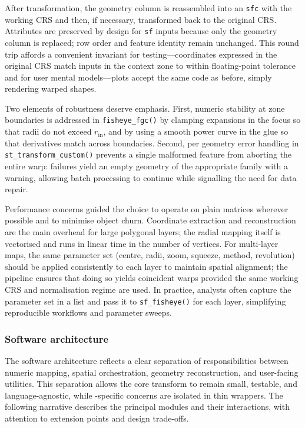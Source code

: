 After transformation, the geometry column is reassembled into an \texttt{sfc} with the working CRS and
then, if necessary, transformed back to the original CRS. Attributes are preserved by design for
\texttt{sf} inputs because only the geometry column is replaced; row order and feature identity remain
unchanged. This round trip affords a convenient invariant for testing---coordinates expressed in the
original CRS match inputs in the context zone to within floating-point tolerance and for user mental
models---plots accept the same code as before, simply rendering warped shapes.

Two elements of robustness deserve emphasis. First, numeric stability at zone boundaries is addressed
in \texttt{fisheye\_fgc()} by clamping expansions in the focus so that radii do not exceed \(r_{\text{in}}\),
and by using a smooth power curve in the glue so that derivatives match across boundaries. Second,
per geometry error handling in \texttt{st\_transform\_custom()} prevents a single malformed feature from
aborting the entire warp: failures yield an empty geometry of the appropriate family with a warning,
allowing batch processing to continue while signalling the need for data repair.

Performance concerns guided the choice to operate on plain matrices wherever possible and to minimise
object churn. Coordinate extraction and reconstruction are the main overhead for large polygonal
layers; the radial mapping itself is vectorised and runs in linear time in the number of vertices.
For multi-layer maps, the same parameter set (centre, radii, zoom, squeeze, method, revolution)
should be applied consistently to each layer to maintain spatial alignment; the pipeline ensures that
doing so yields coincident warps provided the same working CRS and normalisation regime are used. In
practice, analysts often capture the parameter set in a list and pass it to \texttt{sf\_fisheye()} for
each layer, simplifying reproducible workflows and parameter sweeps.

\subsubsection{Software architecture}\label{software-architecture}

The software architecture reflects a clear separation of responsibilities between numeric mapping,
spatial orchestration, geometry reconstruction, and user-facing utilities. This separation allows the
core transform to remain small, testable, and language-agnostic, while -specific concerns are
isolated in thin wrappers. The following narrative describes the principal modules and their
interactions, with attention to extension points and design trade-offs.

